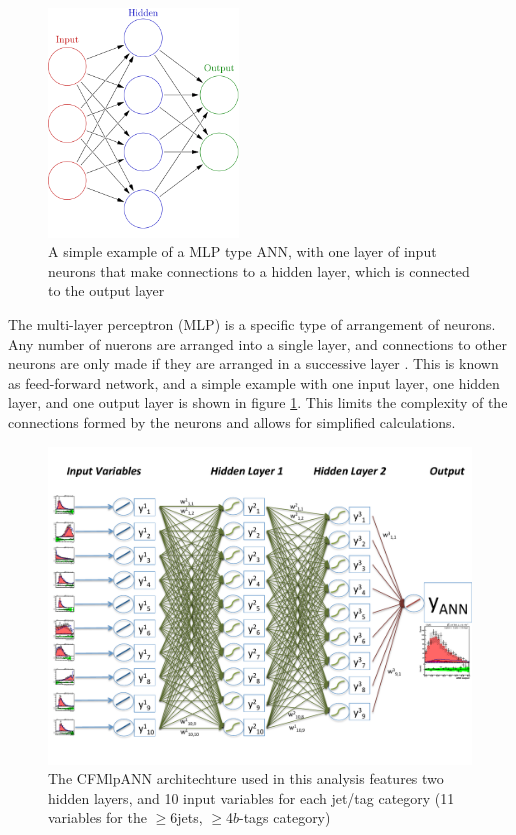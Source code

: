 \begin{figure}[hbtp]
 \begin{center}
   \includegraphics[width=0.45\textwidth]{Figures/Analysis_1_Diagrams/ANN_simple.png}
   \caption{A simple example of a MLP type ANN, with one layer of
     input neurons that make connections to a hidden layer, which is
     connected to the output layer}
   \label{fig:mlp_simple}
 \end{center}
\end{figure}

\par The multi-layer perceptron (MLP) is a specific type of
arrangement of neurons.  Any number of nuerons are arranged into a
single layer, and connections to other neurons are only made if they
are arranged in a successive layer \cite{Hocker:2007ht}.  This is
known as feed-forward network, and a simple example with one input
layer, one hidden layer, and one output layer is shown in figure
\ref{fig:mlp_simple}.  This limits the complexity of the connections
formed by the neurons and allows for simplified calculations.  

\begin{figure}[hbtp]
 \begin{center}
   \includegraphics[width=1.0\textwidth]{Figures/Analysis_1_Diagrams/CFMlpANN_Architecture.pdf}
   \caption{The CFMlpANN architechture used in this analysis features
     two hidden layers, and 10 input variables for each jet/tag
     category (11 variables for the $\ge$6jets, $\ge$4$b$-tags
     category)}
   \label{fig:cfmlpann_arch}
 \end{center}
\end{figure}

